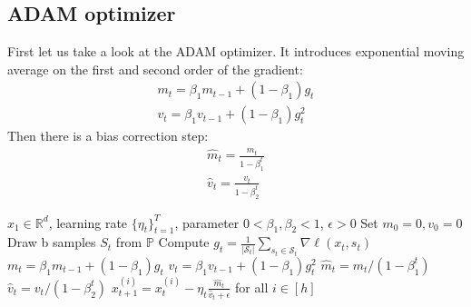\subsection*{ADAM optimizer}
First let us take a look at the ADAM optimizer. It introduces exponential moving average on the first and second order of the gradient:
\begin{align*}
m_{t} = \beta_{1}m_{t-1}+(1-\beta_{1})g_{t} \\
v_{t} = \beta_{1}v_{t-1}+(1-\beta_{1})g_{t}^2
\end{align*}
Then there is a bias correction step:
\begin{align*}
\hat{m}_{t}=\frac{m_t}{1-\beta_1^t} \\
\hat{v}_{t}=\frac{v_t}{1-\beta_2^t}
\end{align*}

\begin{minipage}[b]{.48\textwidth}
\begin{algorithm}[H]\small
	\caption{$ADAM$}
	\label{alg:adam}
	\begin{algorithmic}
		 $x_1 \in \mathbb{R}^d$, learning rate $\{\eta_t\}_{t=1}^T$, parameter $0 < \beta_{1}, \beta_{2} < 1$,  $\epsilon > 0$
		\STATE Set $m_{0} = 0, v_{0} = 0$
		\STATE Draw b samples $S_t$ from $\mathbb{P}$
		\STATE Compute $g_t = \frac{1}{|\mathcal{S}_t|} \sum_{s_t \in \mathcal{S}_t}\nabla \ell(x_t, s_t)$
        \STATE $m_{t} = \beta_{1}m_{t-1}+(1-\beta_{1})g_{t}$
        \STATE $v_{t} = \beta_{1}v_{t-1}+(1-\beta_{1})g_{t}^2$
        \STATE $\hat{m}_{t}={m_t}/(1-\beta_1^t)$
        \STATE $\hat{v}_{t}={v_t}/(1-\beta_2^t)$
        \STATE $x_{t+1}^{(i)} = x_{t}^{(i)}-\eta_t\frac{\hat{m}_t}{\hat{v}_t+\epsilon}$ for all $i \in [h]$
		\ENDFOR
	\end{algorithmic}
\end{algorithm}
\end{minipage}\hfill%

